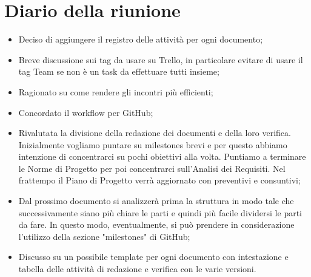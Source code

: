 \section{Diario della riunione}
\begin{itemize}
  \item Deciso di aggiungere il registro delle attività per ogni documento;
  \item Breve discussione sui tag da usare su Trello, in particolare evitare
    di usare il tag Team se non è un task da effettuare tutti insieme;
  \item Ragionato su come rendere gli incontri più efficienti;
  \item Concordato il workflow per GitHub;
  \item Rivalutata la divisione della redazione dei documenti e della loro verifica.
    Inizialmente vogliamo puntare su milestones brevi e per questo abbiamo intenzione
    di concentrarci su pochi obiettivi alla volta. Puntiamo a terminare le Norme di Progetto
    per poi concentrarci sull'Analisi dei Requisiti. Nel frattempo il Piano di Progetto
    verrà aggiornato con preventivi e consuntivi;
  \item Dal prossimo documento si analizzerà prima la struttura in modo tale che successivamente
    siano più chiare le parti e quindi più facile dividersi le parti da fare.
    In questo modo, eventualmente, si può prendere in considerazione l'utilizzo della sezione
    "milestones" di GitHub;
  \item Discusso su un possibile template per ogni documento con intestazione e tabella delle
    attività di redazione e verifica con le varie versioni.
\end{itemize}
